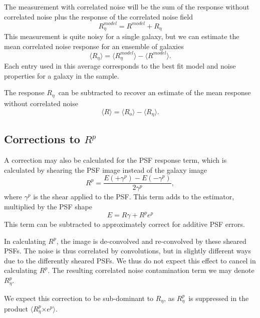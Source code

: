 \documentclass[usegraphicx,usenatbib]{mn2e}
\newcommand{\mcalR}{$R$}
\newcommand{\mcalRpsf}{$R^{p}$}
\newcommand{\mcalRpsfnoise}{$R^{p}_\eta$}
\newcommand{\mcalRo}{$R_o$}
\newcommand{\mcalRnoise}{$R_\eta$}
\newcommand{\mcalRmodel}{$R^{model}$}
\newcommand{\mcalRnoisemodel}{$R^{model}_\eta$}
\begin{document}
The measurement with correlated noise will be the sum of the response
without correlated noise plus the response of the correlated noise field
\begin{equation}
    \mbox{\mcalRnoisemodel} = \mbox{\mcalRmodel} + \mbox{\mcalRnoise}
\end{equation}
This measurement is quite noisy for a single galaxy, but we
can estimate the mean correlated noise response for an ensemble
of galaxies
\begin{equation}
    \langle \mbox{\mcalRnoise} \rangle = \langle \mbox{\mcalRnoisemodel} \rangle - \langle \mbox{\mcalRmodel} \rangle.
\end{equation}
Each entry used in this average corresponds to the best fit model
and noise properties for a galaxy in the sample.

The response \mcalRnoise\ can be subtracted to recover an estimate of the mean
response without correlated noise
\begin{equation}
    \langle \mbox{\mcalR} \rangle = \langle \mbox{\mcalRo} \rangle - \langle \mbox{\mcalRnoise} \rangle.
\end{equation}

\subsection{Corrections to \mcalRpsf}

A correction may also be calculated for the PSF response term, which is
calculated by shearing the PSF image instead of the galaxy image \citep{HuffMcal}
\begin{equation}
    \mbox{\mcalRpsf} = \frac{E(+\gamma^{p}) - E(-\gamma^{p})}{2 \gamma^{p}},
\end{equation}
where $\gamma^{p}$ is the shear applied to the PSF.  This
term adds to the estimator, multiplied by the PSF shape
\begin{equation}
    E = \mbox{\mcalR} \gamma + \mbox{\mcalRpsf} e^{p} 
\end{equation}
This term can be subtracted to approximately correct for additive PSF errors.

In calculating \mcalRpsf, the image is de-convolved and re-convolved by these
sheared PSFs. The noise is thus correlated by convolutions, but in slightly
different ways due to the differently sheared PSFs.  We thus do not expect this
effect to cancel in calculating \mcalRpsf. The resulting correlated noise
contamination term we may denote \mcalRpsfnoise.

We expect this correction to be sub-dominant to \mcalRnoise, as \mcalRpsfnoise\
is suppressed in the product $\langle$\mcalRpsfnoise$ \times e^{p}\rangle$.
\end{document}
